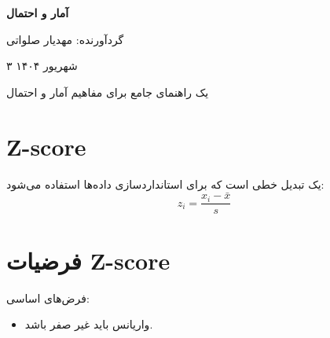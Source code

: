 \documentclass[11pt,a4paper,twocolumn]{article}
\begin{document}
\begin{titlepage}
    \pagecolor{titlebg}
    \centering
    {\color{primarycolor}\Huge\bfseries آمار و احتمال \par}
    {\color{secondarycolor}\large گردآورنده: مهدیار صلواتی \par}
    {\large ۳ شهریور ۱۴۰۴ \par}
    \vfill
    {\large یک راهنمای جامع برای مفاهیم آمار و احتمال}
\end{titlepage}
\pagecolor{white}

\begin{multicols}{2}
\section{Z-score}
یک تبدیل خطی است که برای استانداردسازی داده‌ها استفاده می‌شود:
\begin{equation*}
z_i = \dfrac{x_i - \bar{x}}{s}
\end{equation*}

\section{فرضیات Z-score}
فرض‌های اساسی:
\begin{itemize}[itemsep=5pt]
    \item واریانس باید غیر صفر باشد.
\end{itemize}
\end{multicols}
\end{document}
